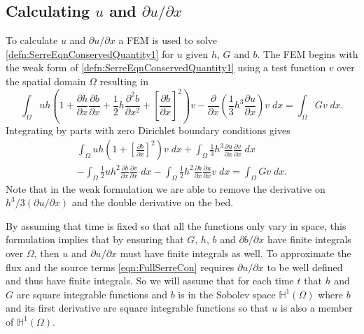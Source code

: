 \documentclass[AMA,STIX1COL]{WileyNJD-v2}
\begin{document}
\subsection{Calculating $u$ and $\partial u / \partial x$}
To calculate $u$ and $\partial u / \partial x$ a FEM is used to solve \eqref{defn:SerreEqnConservedQuantity1} for $u$ given $h$, $G$ and $b$. The FEM begins with the weak form of \eqref{defn:SerreEqnConservedQuantity1} using a test function $v$ over the spatial domain $\Omega$ resulting in
\begin{equation*}
 \int_{\Omega } uh \left(1 + \frac{\partial h}{\partial x}\frac{\partial b}{\partial x} + \frac{1}{2}h\frac{\partial^2 b}{\partial x^2} +  \left[\frac{\partial b}{\partial x}\right]^2 \right) v - \frac{\partial}{\partial x}\left(\frac{1}{3}h^3  \frac{\partial {u}}{\partial x}\right) v \; dx = \int_{\Omega } G v \; dx.
\end{equation*}
Integrating by parts with zero Dirichlet boundary conditions gives
\begin{multline}
\int_{\Omega } uh \left(1 + \left[\frac{\partial b}{\partial x}\right]^2 \right) v \; dx +  \int_{\Omega } \frac{1}{3}h^3  \frac{\partial {u}}{\partial x} \frac{\partial v}{\partial x} \; dx  \\ - 
\int_{\Omega }   \frac{1}{2} u h^2\frac{\partial b}{\partial x}  \frac{\partial v }{\partial x}\; dx - 
\int_{\Omega }   \frac{1}{2}h^2\frac{\partial b}{\partial x}  \frac{\partial u }{\partial x}v \; dx = \int_{\Omega } G v \; dx.
\label{eqn:WeakFormDomain}
\end{multline}
Note that in the weak formulation we are able to remove the derivative on $h^3/3\left(\partial u / \partial x\right)$ and the double derivative on the bed.

By assuming that time is fixed so that all the functions only vary in space, this formulation implies that by ensuring that $G$, $h$, $b$ and $\partial b / \partial x$ have finite integrals over $\Omega$, then $u$ and $\partial u / \partial x$ must have finite integrals as well. To approximate the flux and the source terms \eqref{eqn:FullSerreCon} requires $\partial u / \partial x$ to be well defined and thus have finite integrals. So we will assume that for each time $t$ that $h$ and $G$ are square integrable functions and $b$ is in the Sobolev space $\mathbb{H}^{1}(\Omega)$ where $b$ and its first derivative are square integrable functions so that $u$ is also a member of $\mathbb{H}^{1}(\Omega)$.
\end{document}
